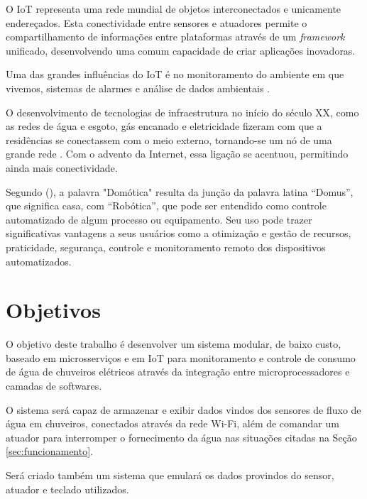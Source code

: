 O IoT representa uma rede mundial de objetos interconectados e unicamente endereçados. Esta conectividade entre sensores e atuadores permite o compartilhamento de informações entre plataformas através de um \textit{framework} unificado, desenvolvendo uma comum capacidade de criar aplicações inovadoras. \cite{RisteskaStojkoska2017}

Uma das grandes influências do IoT é no monitoramento do ambiente em que vivemos, sistemas de alarmes e análise de dados ambientais \cite{Perumal2016}. %

O desenvolvimento de tecnologias de infraestrutura no início do século XX, como as redes de água e esgoto, gás encanado e eletricidade fizeram com que a residências se conectassem com o meio externo, tornando-se um nó de uma grande rede \cite{forty2007objetos}. Com o advento da Internet, essa ligação se acentuou, permitindo ainda mais conectividade. \cite{VarelaDeSouza} 

Segundo \citeauthor{VarelaDeSouza} (\citeyear{VarelaDeSouza}), a palavra "Domótica" resulta da junção da palavra latina
“Domus”, que significa casa, com “Robótica”, que pode ser entendido como controle automatizado de algum processo ou equipamento. Seu uso pode trazer significativas vantagens a seus usuários como a otimização e gestão de recursos, praticidade, segurança, controle e monitoramento remoto dos dispositivos automatizados.



\section{Objetivos} 

O objetivo deste trabalho é desenvolver um sistema modular, de baixo custo, baseado em microsserviços e em IoT para monitoramento e controle de consumo de água de chuveiros elétricos através da integração entre microprocessadores e camadas de softwares. 

O sistema será capaz de armazenar e exibir dados vindos dos sensores de fluxo de água em chuveiros, conectados através da rede Wi-Fi, além de comandar um atuador para interromper o fornecimento da água nas situações citadas na Seção \ref{sec:funcionamento}.

Será criado também um sistema que emulará os dados provindos do sensor, atuador e teclado utilizados.

